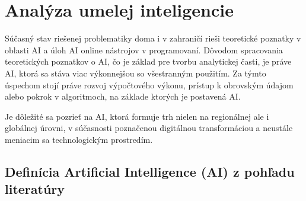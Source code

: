 
\chapter{Analýza umelej inteligencie}

Súčasný stav riešenej problematiky doma i v zahraničí rieši teoretické poznatky v oblasti AI a úloh AI online nástrojov v programovaní.  Dôvodom spracovania teoretických poznatkov o AI, čo je základ pre tvorbu analytickej časti, je práve AI, ktorá sa stáva viac výkonnejšou so všestranným použitím. Za týmto úspechom stojí práve rozvoj výpočtového výkonu, prístup k obrovským údajom alebo pokrok v algoritmoch, na základe ktorých je postavená AI.
\par Je dôležité sa pozrieť na AI, ktorá formuje trh nielen na regionálnej ale i globálnej úrovni, v súčasnosti poznačenou digitálnou transformáciou a neustále meniacim sa technologickým prostredím. 





\section{Definícia Artificial Intelligence (AI) z pohľadu literatúry}

